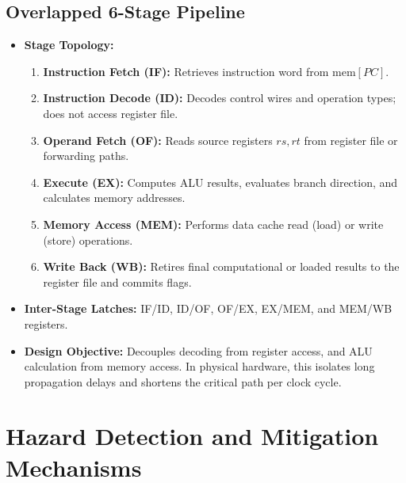 \documentclass[11pt,a4paper]{article}
\begin{document}
\subsection{Overlapped 6-Stage Pipeline}
\begin{itemize}
    \item \textbf{Stage Topology:}
    \begin{enumerate}
        \item \textbf{Instruction Fetch (IF):} Retrieves instruction word from $\text{mem}[PC]$.
        \item \textbf{Instruction Decode (ID):} Decodes control wires and operation types; does not access register file.
        \item \textbf{Operand Fetch (OF):} Reads source registers $rs, rt$ from register file or forwarding paths.
        \item \textbf{Execute (EX):} Computes ALU results, evaluates branch direction, and calculates memory addresses.
        \item \textbf{Memory Access (MEM):} Performs data cache read (load) or write (store) operations.
        \item \textbf{Write Back (WB):} Retires final computational or loaded results to the register file and commits flags.
    \end{enumerate}
    \item \textbf{Inter-Stage Latches:} IF/ID, ID/OF, OF/EX, EX/MEM, and MEM/WB registers.
    \item \textbf{Design Objective:} Decouples decoding from register access, and ALU calculation from memory access. In physical hardware, this isolates long propagation delays and shortens the critical path per clock cycle.
\end{itemize}

\section{Hazard Detection and Mitigation Mechanisms}
\end{document}
